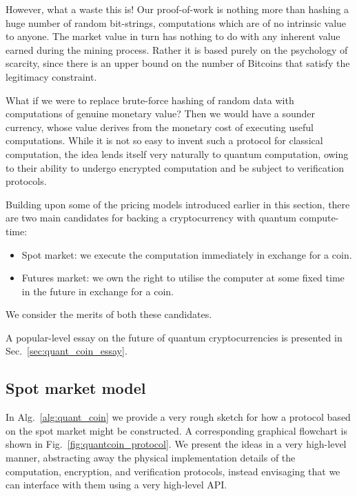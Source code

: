 However, what a waste this is! Our proof-of-work is nothing more than hashing a huge number of random bit-strings, computations which are of no intrinsic value to anyone. The market value in turn has nothing to do with any inherent value earned during the mining process. Rather it is based purely on the psychology of scarcity, since there is an upper bound on the number of Bitcoins that satisfy the legitimacy constraint.

What if we were to replace brute-force hashing of random data with computations of genuine monetary value? Then we would have a sounder currency, whose value derives from the monetary cost of executing useful computations. While it is not so easy to invent such a protocol for classical computation, the idea lends itself very naturally to quantum computation, owing to their ability to undergo encrypted computation and be subject to verification protocols.

Building upon some of the pricing models introduced earlier in this section, there are two main candidates for backing a cryptocurrency with quantum compute-time:
\begin{itemize}
	\item Spot market: we execute the computation immediately in exchange for a coin.
	\item Futures market: we own the right to utilise the computer at some fixed time in the future in exchange for a coin.
\end{itemize}
We consider the merits of both these candidates.

A popular-level essay on the future of quantum cryptocurrencies is presented in Sec.~\ref{sec:quant_coin_essay}.

%
%

\subsection{Spot market model}

In Alg.~\ref{alg:quant_coin} we provide a very rough sketch for how a protocol based on the spot market might be constructed. A corresponding graphical flowchart is shown in Fig.~\ref{fig:quantcoin_protocol}. We present the ideas in a very high-level manner, abstracting away the physical implementation details of the computation, encryption, and verification protocols, instead envisaging that we can interface with them using a very high-level API.

